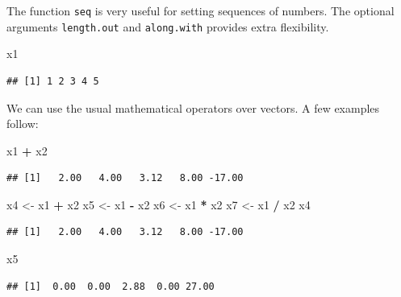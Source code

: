 \documentclass[]{book}
\newenvironment{Shaded}{\begin{snugshade}}{\end{snugshade}}
\newcommand{\StringTok}[1]{\textcolor[rgb]{0.31,0.60,0.02}{#1}}
\newcommand{\OperatorTok}[1]{\textcolor[rgb]{0.81,0.36,0.00}{\textbf{#1}}}
\newcommand{\NormalTok}[1]{#1}
\theoremstyle{definition}
\theoremstyle{definition}
\theoremstyle{remark}
\begin{document}
The function \texttt{seq} is very useful for setting sequences of
numbers. The optional arguments \texttt{length.out} and
\texttt{along.with} provides extra flexibility.

\begin{Shaded}
\begin{Highlighting}[]
\NormalTok{x1}
\end{Highlighting}
\end{Shaded}

\begin{verbatim}
## [1] 1 2 3 4 5
\end{verbatim}

We can use the usual mathematical operators over vectors. A few examples
follow:

\begin{Shaded}
\begin{Highlighting}[]
\NormalTok{x1 }\OperatorTok{+}\StringTok{ }\NormalTok{x2}
\end{Highlighting}
\end{Shaded}

\begin{verbatim}
## [1]   2.00   4.00   3.12   8.00 -17.00
\end{verbatim}

\begin{Shaded}
\begin{Highlighting}[]
\NormalTok{x4 <-}\StringTok{ }\NormalTok{x1 }\OperatorTok{+}\StringTok{ }\NormalTok{x2}
\NormalTok{x5 <-}\StringTok{ }\NormalTok{x1 }\OperatorTok{-}\StringTok{ }\NormalTok{x2}
\NormalTok{x6 <-}\StringTok{ }\NormalTok{x1 }\OperatorTok{*}\StringTok{ }\NormalTok{x2}
\NormalTok{x7 <-}\StringTok{ }\NormalTok{x1 }\OperatorTok{/}\StringTok{ }\NormalTok{x2}
\NormalTok{x4}
\end{Highlighting}
\end{Shaded}

\begin{verbatim}
## [1]   2.00   4.00   3.12   8.00 -17.00
\end{verbatim}

\begin{Shaded}
\begin{Highlighting}[]
\NormalTok{x5}
\end{Highlighting}
\end{Shaded}

\begin{verbatim}
## [1]  0.00  0.00  2.88  0.00 27.00
\end{verbatim}
\end{document}
